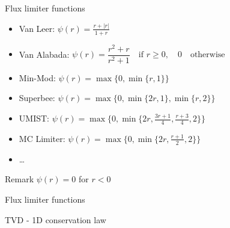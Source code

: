 \documentclass{beamer}
\begin{document}
\begin{frame}{Flux limiter functions}
	\begin{itemize}
	\item Van Leer: $\psi(r) = \frac{r+|r|}{1+r}$
	\item Van Alabada: $\psi(r)= \dfrac{r^2+r}{r^2+1} \quad \text{if $r\geq 
		0$}, \quad 0 \quad \text{otherwise}$
	\item Min-Mod: 	$\psi(r) = \max \{0, \min \{ r,1\} \}$
	\vspace{0.4\baselineskip}
	\item Superbee: $\psi(r)=\max \{0, \min \{ 2r, 1\}, \min \{ r, 2\} \}$
	\vspace{0.2\baselineskip}
	\item UMIST: $\psi(r)=\max \bigg\{0, \min \bigg\{ 2r, \frac{3r+1}{4}, 
	\frac{r+3}{4}, 2\bigg\} \bigg\}$
	\item MC Limiter: $\psi(r)=\max \bigg\{0, \min \bigg\{ 2r, \frac{r+1}{2}, 
	2\bigg\} \bigg\}$
	\item \dots
	\end{itemize}
\begin{block}{Remark} %
	\centering
$\psi(r) = 0$ for $r<0$
\end{block}
\end{frame}
\begin{frame}{Flux limiter functions}
\begin{figure}
	\centering
	\hspace{-1cm}
	
\end{figure}
\end{frame}
\begin{frame}{TVD - 1D conservation law}
\begin{figure}
	\centering
	\hspace{-1cm}
	
\end{figure}
\end{frame}
\end{document}
